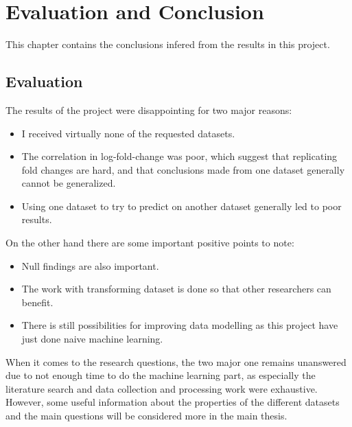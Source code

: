\chapter{Evaluation and Conclusion}
\label{cha:evaluationAndConclusion}

This chapter contains the conclusions infered from the results in this project.

\section{Evaluation}
\label{sec:evaluation}

The results of the project were disappointing for two major reasons:
\begin{itemize}
    \item I received virtually none of the requested datasets.
    \item The correlation in log-fold-change was poor, which suggest that replicating fold changes are hard, and that conclusions made from one dataset generally cannot be generalized.
    \item Using one dataset to try to predict on another dataset generally led to poor results.
\end{itemize}

On the other hand there are some important positive points to note:
\begin{itemize}
    \item Null findings are also important.
    \item The work with transforming dataset is done so that other researchers can benefit.
    \item There is still possibilities for improving data modelling as this project have just done naive machine learning.
\end{itemize}

When it comes to the research questions, the two major one remains unanswered due to not enough time to do the machine learning part, as especially the literature search and data collection and processing work were exhaustive. However, some useful information about the properties of the different datasets and the main questions will be considered more in the main thesis.

